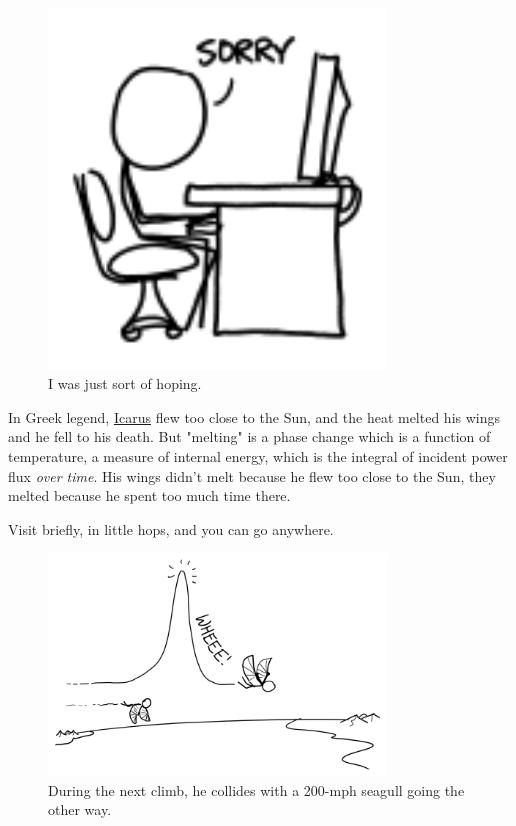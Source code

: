 {\begin{figure}[!htbp]
\centering
\includegraphics[scale=0.5, max width=0.8\textwidth]{imgs/a/115/hope.png}
\caption{I was just sort of hoping.}
\end{figure}

{In Greek legend, \href{http://en.wikipedia.org/wiki/Icarus}{Icarus} flew too close to the Sun, and the heat melted his wings and he fell to his death. But "melting" is a phase change which is a function of temperature, a measure of internal energy, which is the integral of incident power flux \emph{over time}. His wings didn't melt because he flew too close to the Sun, they melted because he spent too much time there.}

{Visit briefly, in little hops, and you can go anywhere.}

\begin{figure}[!htbp]
\centering
\includegraphics[scale=0.5, max width=0.8\textwidth]{imgs/a/115/icarus.png}
\caption{During the next climb, he collides with a 200-mph seagull going the other way.}
\end{figure}

}
